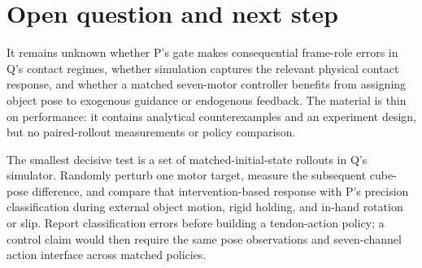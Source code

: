 \documentclass{article}
\begin{document}
\section*{Open question and next step}

It remains unknown whether P's gate makes consequential frame-role errors in Q's contact regimes, whether simulation captures the relevant physical contact response, and whether a matched seven-motor controller benefits from assigning object pose to exogenous guidance or endogenous feedback. The material is thin on performance: it contains analytical counterexamples and an experiment design, but no paired-rollout measurements or policy comparison. 

The smallest decisive test is a set of matched-initial-state rollouts in Q's simulator. Randomly perturb one motor target, measure the subsequent cube-pose difference, and compare that intervention-based response with P's precision classification during external object motion, rigid holding, and in-hand rotation or slip. Report classification errors before building a tendon-action policy; a control claim would then require the same pose observations and seven-channel action interface across matched policies. 
\end{document}
